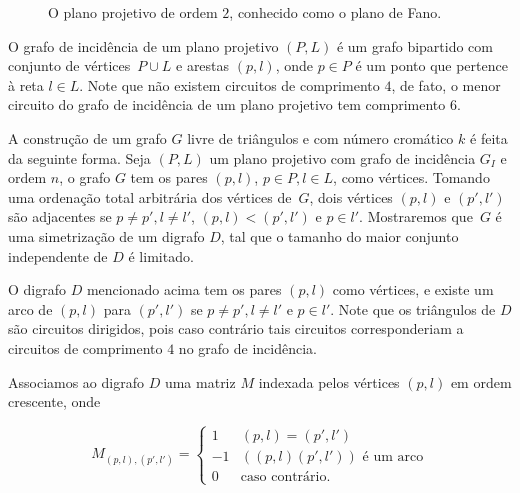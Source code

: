 \begin{figure}[H]
\centering
{}
\caption{O plano projetivo de ordem $2$, conhecido como o plano de Fano.}
\label{fig:fanoexample}
\end{figure}

O grafo de incidência de um plano projetivo $(P,L)$ é um grafo bipartido com conjunto de vértices~$P \cup L$ e arestas $(p,l)$, onde $p\in P$ é um ponto que pertence à reta $l \in L$. Note que não existem circuitos de comprimento $4$, de fato, o menor circuito do grafo de incidência de um plano projetivo tem comprimento $6$.

A construção de um grafo $G$ livre de triângulos e com número cromático $k$ é feita da seguinte forma. Seja $(P,L)$ um plano projetivo com grafo de incidência $G_I$ e ordem $n$, o grafo $G$ tem os pares $(p,l)$, $p\in P, l\in L$, como vértices. Tomando uma ordenação total arbitrária dos vértices de~$G$, dois vértices $(p,l)$ e $(p',l')$ são adjacentes se $p \neq p', l \neq l'$, $(p,l) < (p',l')$ e $p \in l'$. Mostraremos que~$G$ é uma simetrização de um digrafo $D$, tal que o tamanho do maior conjunto independente de $D$ é limitado.

O digrafo $D$ mencionado acima tem os pares $(p,l)$ como vértices, e existe um arco de $(p,l)$ para $(p',l')$ se $p \neq p', l \neq l'$ e $p\in l'$. Note que os triângulos de $D$ são circuitos dirigidos, pois caso contrário tais circuitos corresponderiam a circuitos de comprimento $4$ no grafo de incidência.

Associamos ao digrafo $D$ uma matriz $M$ indexada pelos vértices $(p,l)$ em ordem crescente, onde

\[ M_{(p,l),(p',l')} = \begin{cases} 
      1 & (p,l) = (p',l') \\
      -1 & ((p,l)(p',l')) \text{ é um arco} \\
      0 & \text{caso contrário.}
   \end{cases}
\]

